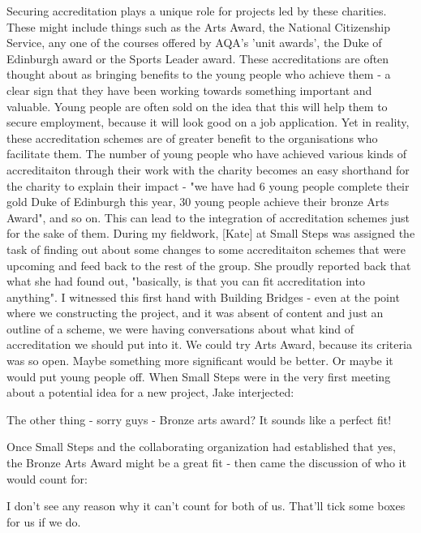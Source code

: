Securing accreditation plays a unique role for projects led by these charities. These might include things such as the Arts Award, the National Citizenship Service, any one of the courses offered by AQA's 'unit awards', the Duke of Edinburgh award or the Sports Leader award. These accreditations are often thought about as bringing benefits to the young people who achieve them - a clear sign that they have been working towards something important and valuable. Young people are often sold on the idea that this will help them to secure employment, because it will look good on a job application. Yet in reality, these accreditation schemes are of greater benefit to the organisations who facilitate them. The number of young people who have achieved various kinds of accreditaiton through their work with the charity becomes an easy shorthand for the charity to explain their impact - "we have had 6 young people complete their gold Duke of Edinburgh this year, 30 young people achieve their bronze Arts Award", and so on. This can lead to the integration of accreditation schemes just for the sake of them. During my fieldwork, [Kate] at Small Steps was assigned the task of finding out about some changes to some accreditaiton schemes that were upcoming and feed back to the rest of the group. She proudly reported back that what she had found out, "basically, is that you can fit accreditation into anything". I witnessed this first hand with Building Bridges - even at the point where we constructing the project, and it was absent of content and just an outline of a scheme, we were having conversations about what kind of accreditation we should put into it. We could try Arts Award, because its criteria was so open. Maybe something more significant would be better. Or maybe it would put young people off. When Small Steps were in the very first meeting about a potential idea for a new project, Jake interjected:

The other thing - sorry guys - Bronze arts award? It sounds like a perfect fit!

Once Small Steps and the collaborating organization had established that yes, the Bronze Arts Award might be a great fit - then came the discussion of who it would count for:

I don't see any reason why it can't count for both of us. That'll tick some boxes for us if we do.

